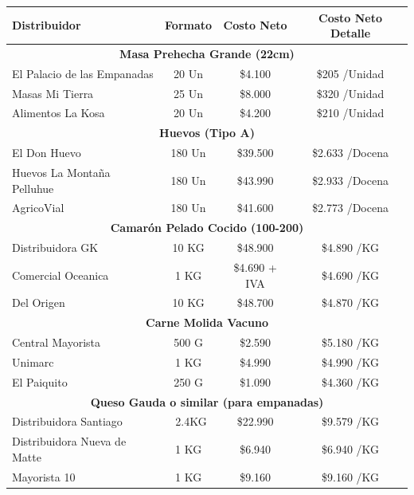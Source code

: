 \documentclass[12pt]{article}
\begin{document}
\begin{table}[h!]
    \centering
    \begin{tabular}{|| l | c | c | c||} 
        \hline
    \textbf{Distribuidor} & \textbf{Formato} & \textbf{Costo Neto} & \textbf{Costo Neto Detalle} \\ [0.5ex]
        \hline\hline
        \multicolumn{4}{||c||}{\textbf{Masa Prehecha Grande (22cm)}} \\ [0.5ex] \hline \hline
        El Palacio de las Empanadas & 20 Un & \$4.100 & \$205 /Unidad \\ \hline
        Masas Mi Tierra & 25 Un & \$8.000 & \$320 /Unidad \\ \hline
        Alimentos La Kosa & 20 Un & \$4.200 & \$210 /Unidad \\ [1ex] \hline \hline

        \multicolumn{4}{||c||}{\textbf{Huevos (Tipo A)}} \\ [0.5ex] \hline \hline
        El Don Huevo & 180 Un & \$39.500 & \$2.633 /Docena \\ \hline
        Huevos La Montaña Pelluhue & 180 Un & \$43.990 & \$2.933 /Docena \\ \hline
        AgricoVial & 180 Un & \$41.600 & \$2.773 /Docena \\ [1ex] \hline \hline

        \multicolumn{4}{||c||}{\textbf{Camarón Pelado Cocido (100-200)}} \\ [0.5ex] \hline \hline
        Distribuidora GK & 10 KG & \$48.900 & \$4.890 /KG \\ \hline
        Comercial Oceanica & 1 KG & \$4.690 + IVA & \$4.690 /KG \\ \hline %
        Del Origen & 10 KG & \$48.700 & \$4.870 /KG \\ [1ex] \hline \hline

        \multicolumn{4}{||c||}{\textbf{Carne Molida Vacuno}} \\ [0.5ex] \hline \hline
        Central Mayorista & 500 G & \$2.590 & \$5.180 /KG \\ \hline 
        Unimarc & 1 KG & \$4.990 & \$4.990 /KG \\ \hline 
        El Paiquito & 250 G & \$1.090 & \$4.360 /KG \\ [1ex] \hline \hline

        \multicolumn{4}{||c||}{\textbf{Queso Gauda o similar (para empanadas)}} \\ [0.5ex] \hline \hline
        Distribuidora Santiago & ~2.4KG & \$22.990 & \$9.579 /KG \\ \hline %
        Distribuidora Nueva de Matte & 1 KG & \$6.940 & \$6.940 /KG \\ \hline
        Mayorista 10 & 1 KG & \$9.160 & \$9.160 /KG \\ [1ex] \hline \hline


\end{tabular}
\end{table}
\end{document}
